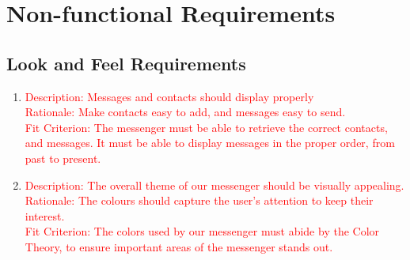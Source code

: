 \documentclass[12pt, titlepage]{article}
\begin{document}
		
	\newpage
\section{Non-functional Requirements}

    	\subsection{Look and Feel Requirements}
    	\begin{enumerate}[label=NFR\arabic*:, leftmargin=1in]
    	\item \textcolor{red}{Description: Messages and contacts should display properly \\
    		  Rationale: Make contacts easy to add, and messages easy to send. \\
    		  Fit Criterion: The messenger must be able to retrieve the correct contacts, and messages. It must be able to display messages in the proper order, from past to present.}
    		  
    	\item \textcolor{red}{Description: The overall theme of our messenger should be visually appealing. \\
    		  Rationale: The colours should capture the user's attention to keep their interest. \\
    		  Fit Criterion: The colors used by our messenger must abide by the Color Theory, to ensure important areas of the messenger stands out. }
    	\end{enumerate}
\end{document}
